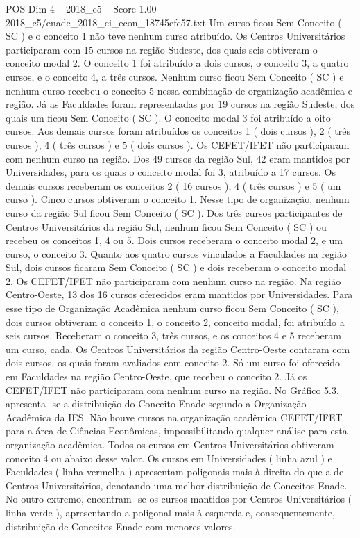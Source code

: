 \begin{textsample}{POS Dim 4 – 2018\_c5 – Score 1.00 – 2018\_c5/enade\_2018\_ci\_econ\_18745efc57.txt}
Um curso ficou Sem Conceito ( SC ) e o conceito 1 não teve nenhum curso atribuído.
Os Centros Universitários participaram com 15 cursos na região Sudeste, dos quais seis obtiveram o conceito modal 2.
O conceito 1 foi atribuído a dois cursos, o conceito 3, a quatro cursos, e o conceito 4, a três cursos.
Nenhum curso ficou Sem Conceito ( SC ) e nenhum curso recebeu o conceito 5 nessa combinação de organização acadêmica e região.
Já as Faculdades foram representadas por 19 cursos na região Sudeste, dos quais um ficou Sem Conceito ( SC ).
O conceito modal 3 foi atribuído a oito cursos.
Aos demais cursos foram atribuídos os conceitos 1 ( dois cursos ), 2 ( três cursos ), 4 ( três cursos ) e 5 ( dois cursos ).
Os CEFET/IFET não participaram com nenhum curso na região.
Dos 49 cursos da região Sul, 42 eram mantidos por Universidades, para os quais o conceito modal foi 3, atribuído a 17 cursos.
Os demais cursos receberam os conceitos 2 ( 16 cursos ), 4 ( três cursos ) e 5 ( um curso ).
Cinco cursos obtiveram o conceito 1.
Nesse tipo de organização, nenhum curso da região Sul ficou Sem Conceito ( SC ).
Dos três cursos participantes de Centros Universitários da região Sul, nenhum ficou Sem Conceito ( SC ) ou recebeu os conceitos 1, 4 ou 5.
Dois cursos receberam o conceito modal 2, e um curso, o conceito 3.
Quanto aos quatro cursos vinculados a Faculdades na região Sul, dois cursos ficaram Sem Conceito ( SC ) e dois receberam o conceito modal 2.
Os CEFET/IFET não participaram com nenhum curso na região.
Na região Centro-Oeste, 13 dos 16 cursos oferecidos eram mantidos por Universidades.
Para esse tipo de Organização Acadêmica nenhum curso ficou Sem Conceito ( SC ), dois cursos obtiveram o conceito 1, o conceito 2, conceito modal, foi atribuído a seis cursos.
Receberam o conceito 3, três cursos, e os conceitos 4 e 5 receberam um curso, cada.
Os Centros Universitários da região Centro-Oeste contaram com dois cursos, os quais foram avaliados com conceito 2.
Só um curso foi oferecido em Faculdades na região Centro-Oeste, que recebeu o conceito 2.
Já os CEFET/IFET não participaram com nenhum curso na região.
No Gráfico 5.3, apresenta -se a distribuição do Conceito Enade segundo a Organização Acadêmica da IES.
Não houve cursos na organização acadêmica CEFET/IFET para a área de Ciências Econômicas, impossibilitando qualquer análise para esta organização acadêmica.
Todos os cursos em Centros Universitários obtiveram conceito 4 ou abaixo desse valor.
Os cursos em Universidades ( linha azul ) e Faculdades ( linha vermelha ) apresentam poligonais mais à direita do que a de Centros Universitários, denotando uma melhor distribuição de Conceitos Enade.
No outro extremo, encontram -se os cursos mantidos por Centros Universitários ( linha verde ), apresentando a poligonal mais à esquerda e, consequentemente, distribuição de Conceitos Enade com menores valores.

\end{textsample}
